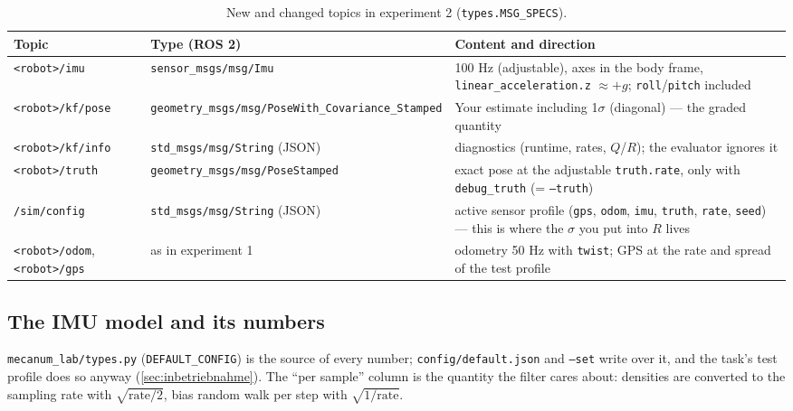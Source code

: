 \documentclass[12pt,a4paper]{scrartcl}
\newcommand{\thema}[1]{\texttt{#1}}
\newcommand{\ordner}[1]{\texttt{#1}}
\newcommand{\kommando}[1]{\texttt{#1}}
\begin{document}
\begin{table}[ht]\centering\small
\caption{New and changed topics in experiment 2 (\ordner{types.MSG\_SPECS}).}
\label{tab:themen}
\begin{tabular}{@{}p{4.1cm}p{5.4cm}p{5.5cm}@{}}
\toprule
Topic & Type (ROS 2) & Content and direction \\
\midrule
\thema{<robot>/imu} & \thema{sensor\_msgs/msg/Imu}
  & 100 Hz (adjustable), axes in the body frame, \thema{linear\_acceleration.z}
  \(\approx +g\); \thema{roll}/\thema{pitch} included \\
\thema{<robot>/kf/pose} & \thema{geometry\_msgs/msg/PoseWith\_Covariance\_Stamped}
  & Your estimate including 1\(\sigma\) (diagonal) — the graded quantity \\
\thema{<robot>/kf/info} & \thema{std\_msgs/msg/String} (JSON)
  & diagnostics (runtime, rates, \(Q\)/\(R\)); the evaluator ignores it \\
\thema{<robot>/truth} & \thema{geometry\_msgs/msg/PoseStamped}
  & exact pose at the adjustable \thema{truth.rate}, only with \thema{debug\_truth}
  (= \kommando{--truth}) \\
\thema{/sim/config} & \thema{std\_msgs/msg/String} (JSON)
  & active sensor profile (\thema{gps}, \thema{odom}, \thema{imu}, \thema{truth},
  \thema{rate}, \thema{seed}) — this is where the \(\sigma\) you put into \(R\) lives \\
\thema{<robot>/odom}, \thema{<robot>/gps} & as in experiment 1
  & odometry 50 Hz with \thema{twist}; GPS at the rate and spread of the test profile \\
\bottomrule
\end{tabular}
\end{table}

\subsection{The IMU model and its numbers}
\ordner{mecanum\_lab/types.py} (\texttt{DEFAULT\_CONFIG}) is the source of every number;
\ordner{config/default.json} and \kommando{--set} write over it, and the task's test
profile does so anyway (\cref{sec:inbetriebnahme}). The ``per sample'' column is the
quantity the filter cares about: densities are converted to the sampling rate with
\(\sqrt{\text{rate}/2}\), bias random walk per step with \(\sqrt{1/\text{rate}}\).
\end{document}
